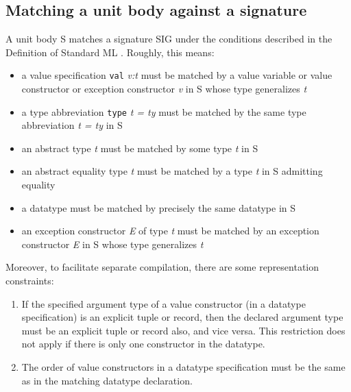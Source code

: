 \documentclass[fleqn]{article}
\begin{document}
\subsection{Matching a unit body against a signature}
\label{sec-matching-body-signature}

A unit body S matches a signature SIG under the conditions described
in the Definition of Standard ML \cite{Milner:1997:TheDefinition}.
Roughly, this means:

\begin{itemize}
\item a value specification {\tt val} {\it v:t\/} must be matched by a
  value variable or value constructor or exception constructor {\it
v\/} in S whose type generalizes {\it t\/}
 
\item a type abbreviation {\tt type} {\it t = ty\/} must be matched by
  the same type abbreviation {\it t = ty\/} in S

\item an abstract type {\it t\/} must be matched by some type {\it
    t\/} in S

\item an abstract equality type {\it t\/} must be matched by a type
  {\it t\/} in S admitting equality

\item a datatype must be matched by precisely the same datatype in S

\item an exception constructor {\it E\/} of type {\it t\/}
  must be matched by an exception constructor {\it E\/} in S whose
type generalizes {\it t\/}
\end{itemize}

\noindent Moreover, to facilitate separate compilation, there are some
representation constraints:

\begin{enumerate}
\item If the specified argument type of a value constructor (in a
  datatype specification) is an explicit tuple or record, then the
  declared argument type must be an explicit tuple or record also, and
  vice versa.  This restriction does not apply if there is only one
  constructor in the datatype.

\item The order of value constructors in a datatype specification must
  be the same as in the matching datatype declaration.
\end{enumerate}
\end{document}
